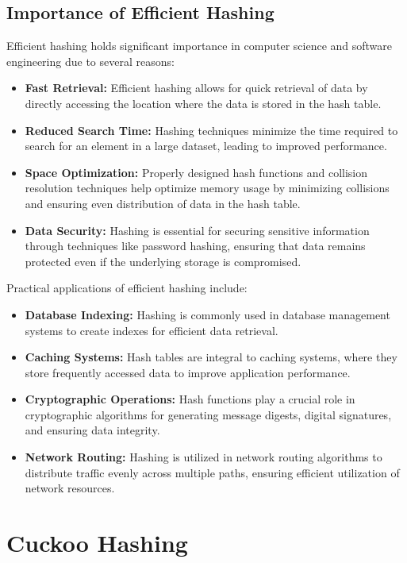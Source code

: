 \documentclass[12pt]{article}
\begin{document}
\subsection{Importance of Efficient Hashing}

Efficient hashing holds significant importance in computer science and software engineering due to several reasons:

\begin{itemize}
    \item \textbf{Fast Retrieval:} Efficient hashing allows for quick retrieval of data by directly accessing the location where the data is stored in the hash table.
    \item \textbf{Reduced Search Time:} Hashing techniques minimize the time required to search for an element in a large dataset, leading to improved performance.
    \item \textbf{Space Optimization:} Properly designed hash functions and collision resolution techniques help optimize memory usage by minimizing collisions and ensuring even distribution of data in the hash table.
    \item \textbf{Data Security:} Hashing is essential for securing sensitive information through techniques like password hashing, ensuring that data remains protected even if the underlying storage is compromised.
\end{itemize}

Practical applications of efficient hashing include:

\begin{itemize}
    \item \textbf{Database Indexing:} Hashing is commonly used in database management systems to create indexes for efficient data retrieval.
    \item \textbf{Caching Systems:} Hash tables are integral to caching systems, where they store frequently accessed data to improve application performance.
    \item \textbf{Cryptographic Operations:} Hash functions play a crucial role in cryptographic algorithms for generating message digests, digital signatures, and ensuring data integrity.
    \item \textbf{Network Routing:} Hashing is utilized in network routing algorithms to distribute traffic evenly across multiple paths, ensuring efficient utilization of network resources.
\end{itemize}
\newpage


\section{Cuckoo Hashing}
\end{document}
